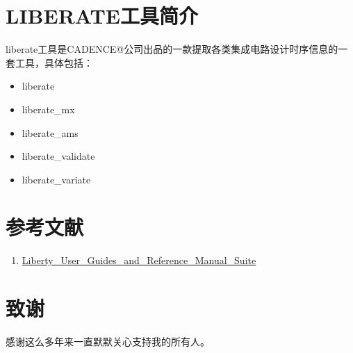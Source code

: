 \documentclass{training}
\begin{document}
\section{LIBERATE工具简介}
liberate工具是CADENCE@公司出品的一款提取各类集成电路设计时序信息的一套工具，具体包括：
\begin{itemize}
\item liberate
\item liberate\_mx
\item liberate\_ams
\item liberate\_validate
\item liberate\_variate
\end{itemize}

\newpage
\section{参考文献}
\begin{enumerate}
  \item \href{}{Liberty\_User\_Guides\_and\_Reference\_Manual\_Suite}
\end{enumerate}
\newpage
\section{致谢}
感谢这么多年来一直默默关心支持我的所有人。
\end{document}
